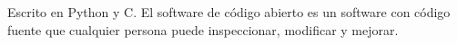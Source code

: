 \thispagestyle{empty}
{\small
\strut\vfill %
\noindent Escrito en Python y C. El software de código abierto es un software con código fuente que cualquier persona puede inspeccionar, modificar y mejorar.
}
\clearpage